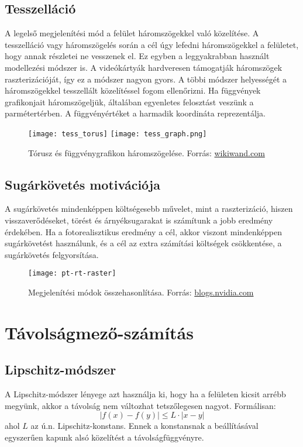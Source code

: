 \subsection{Tesszelláció}
A legelső megjelenítési mód a felület háromszögekkel való közelítése. A tesszelláció vagy háromszögelés során a cél úgy lefedni háromszögekkel a felületet, hogy annak részletei ne vesszenek el. Ez egyben a leggyakrabban használt modellezési módszer is. A videókártyák hardveresen támogatják háromszögek raszterizációját, így ez a módszer nagyon gyors. A többi módszer helyességét a háromszögekkel tesszellált közelítéssel fogom ellenőrizni. Ha függvények grafikonjait háromszögeljük, általában egyenletes felosztást veszünk a parmétertérben. A függvényértéket a harmadik koordináta reprezentálja.
\begin{figure}[H]
	\centering
	\texttt{[image: tess\_torus]}
	\hspace{5pt}
	\texttt{[image: tess\_graph.png]}
	\caption{Tórusz és függvénygrafikon háromszögelése. Forrás: \href{https://www.wikiwand.com/en/Surface_triangulation}{wikiwand.com}}
\end{figure}

\subsection{Sugárkövetés motivációja}
A sugárkövetés mindenképpen költségesebb művelet, mint a raszterizáció, hiszen visszaverődéseket, törést és árnyéksugarakat is számítunk a jobb eredmény érdekében. Ha a fotorealisztikus eredmény a cél, akkor viszont mindenképpen sugárkövetést használunk, és a cél az extra számítási költségek csökkentése, a sugárkövetés felgyorsítása. 
\begin{figure}[H]
	\centering
	\texttt{[image: pt-rt-raster]}
	\caption{Megjelenítési módok összehasonlítása. Forrás: \href{https://blogs.nvidia.com/blog/2022/03/23/what-is-path-tracing/}{blogs.nvidia.com}}
\end{figure}


\section{Távolságmező-számítás}

\subsection{Lipschitz-módszer}
A Lipschitz-módszer lényege azt használja ki, hogy ha a felületen kicsit arrébb megyünk, akkor a távolság nem változhat tetszőlegesen nagyot. Formálisan:
$$ |f(x)-f(y)| \le L \cdot |x-y| $$
ahol $L$ az ú.n. Lipschitz-konstans. Ennek a konstansnak a beállításával egyszerűen kapunk alsó közelítést a távolságfüggvényre.

